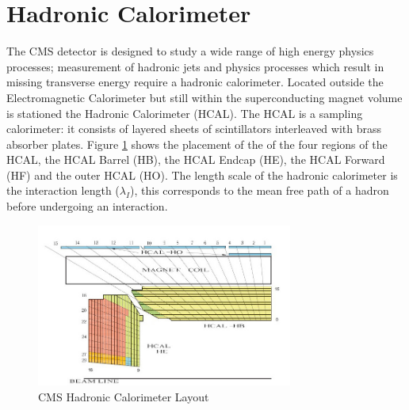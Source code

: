 \section{Hadronic Calorimeter}
The CMS detector is designed to study a wide range of high energy 
physics processes; measurement of hadronic jets and
physics processes which result in missing transverse energy require
a hadronic calorimeter. 
Located outside the Electromagnetic Calorimeter but still within the
superconducting magnet volume is stationed the Hadronic Calorimeter (HCAL).
The HCAL is a sampling calorimeter: it consists of layered 
sheets of scintillators interleaved with brass absorber plates. 
Figure \ref{fig:HCALLayout}
shows the placement of the of the four regions of the HCAL, the HCAL Barrel (HB),
the HCAL Endcap (HE), the HCAL Forward (HF) and the outer HCAL (HO). 
The length scale of the hadronic calorimeter is the interaction length ($\lambda_{I}$),
this corresponds to the mean free path of a hadron before undergoing
an interaction. 
\begin{figure}[hb]
  \centering
	\includegraphics[width=0.75\textwidth]{images/HCAL.jpg}
  	\caption[HCAL Layout]
   	{CMS Hadronic Calorimeter Layout}
	\label{fig:HCALLayout}
\end{figure}


